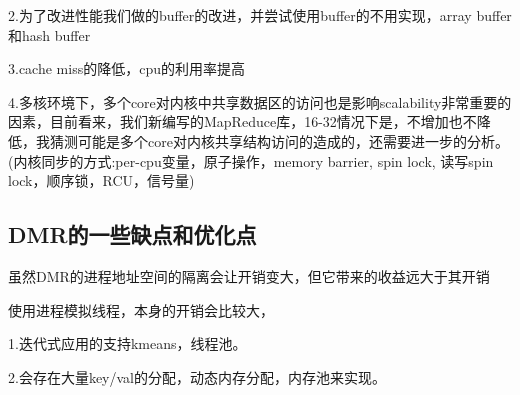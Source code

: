2.为了改进性能我们做的buffer的改进，并尝试使用buffer的不用实现，array buffer和hash buffer

3.cache miss的降低，cpu的利用率提高

4.多核环境下，多个core对内核中共享数据区的访问也是影响scalability非常重要的因素，目前看来，我们新编写的MapReduce库，16-32情况下是，不增加也不降低，我猜测可能是多个core对内核共享结构访问的造成的，还需要进一步的分析。(内核同步的方式:per-cpu变量，原子操作，memory barrier, spin lock, 读写spin lock，顺序锁，RCU，信号量)

\subsection{DMR的一些缺点和优化点}
虽然DMR的进程地址空间的隔离会让开销变大，但它带来的收益远大于其开销

使用进程模拟线程，本身的开销会比较大，

1.迭代式应用的支持kmeans，线程池。

2.会存在大量key/val的分配，动态内存分配，内存池来实现。



